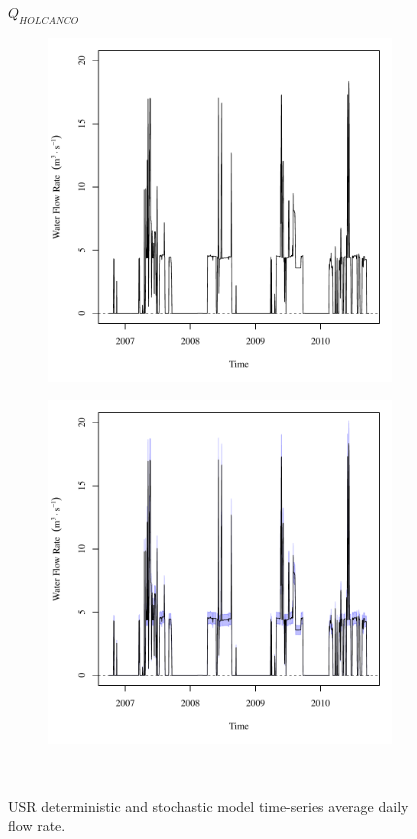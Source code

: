 \subfiguremid
\begin{landscape}
	\begin{figure}
		\centering
		$ Q_{HOLCANCO} $
		\begin{subfigure}{0.7\textwidth}
			\centering
			\includegraphics[width=\tableCustomSize]{"Figures/Results_USR/Deterministic/Q HOL"}
		\end{subfigure}%
		\begin{subfigure}{0.7\textwidth}
			\centering
			\includegraphics[width=\tableCustomSize]{"Figures/Results_USR/Stochastic/Q HOL"}
		\end{subfigure}\\
		\caption{USR deterministic and stochastic model time-series average daily flow rate.}
	\end{figure}
\end{landscape}
